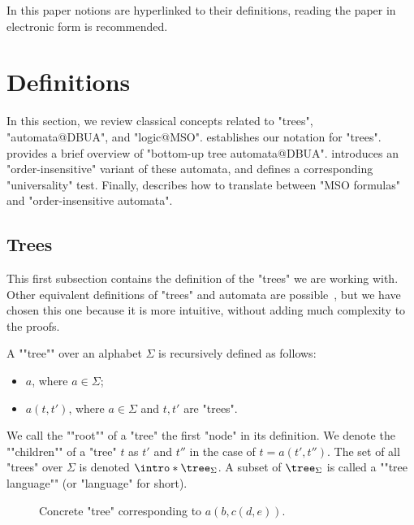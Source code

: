 \documentclass[a4paper,UKenglish,cleveref, autoref, thm-restate]{lipics-v2021}
\begin{document}
In this paper notions are hyperlinked to their definitions, reading the paper in electronic form is recommended.

\section{Definitions} \label{sec:definitions}

In this section, we review classical concepts related to "trees", "automata@DBUA", and "logic@MSO".
 establishes our notation for "trees".
 provides a brief overview of "bottom-up tree automata@DBUA".
 introduces an "order-insensitive" variant of these automata, and
 defines a corresponding "universality" test.
Finally,  describes how to translate between "MSO formulas" and "order-insensitive automata".
\subsection{Trees}\label{sec:trees}

This first subsection contains the definition of the "trees" we are working with. Other equivalent definitions of "trees" and
automata are possible~\cite{Thomas1997, tata}, but we have chosen this one because it is more intuitive, without adding much complexity to the proofs.

\begin{definition}
	\AP A ""tree"" over an alphabet $\Sigma$ is recursively defined as follows:
	\begin{itemize}
		\item $a$, where $a \in \Sigma$;
		\item $a(t,t')$, where $a \in \Sigma$ and $t, t'$ are "trees".
	\end{itemize}
	We call the ""root"" of a "tree" the first "node" in its definition.
	We denote the ""children"" of a "tree" $t$ as $t'$ and $t''$ in the case of $t = a(t',t'')$.
	The set of all "trees" over $\Sigma$ is denoted $\intro* \tree_{\Sigma}$.
	A subset of $\tree_{\Sigma}$ is called a ""tree language"" (or "language" for short).
\end{definition}

\begin{figure}[h]
	\centering


	\caption{Concrete "tree" corresponding to $a(b, c(d, e))$.}
\end{figure}
\end{document}
